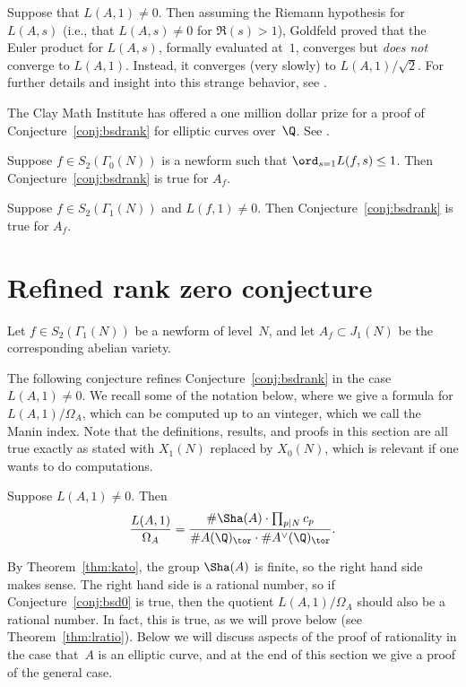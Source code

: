\documentclass{report}
\begin{document}
\begin{remark}
  Suppose that $L(A,1)\neq 0$.  Then assuming the Riemann hypothesis
  for $L(A,s)$ (i.e., that $L(A,s)\neq 0$ for $\Re(s)>1$), Goldfeld
  \cite{goldfeld:L1} proved that the Euler product for $L(A,s)$,
  formally evaluated at~$1$, converges but {\em does not} converge to
  $L(A,1)$.  Instead, it converges (very slowly) to $L(A,1)/\sqrt{2}$.
  For further details and insight into this strange behavior, see
  \cite{conrad:eulerprod}.
\end{remark}


\begin{remark}
  The Clay Math Institute has offered a one million dollar prize for a
  proof of Conjecture~\ref{conj:bsdrank} for elliptic curves
  over~$\Q$.  See \cite{wiles:cmi}.
\end{remark}

\begin{theorem}\label{thm:kolylog}
Suppose $f\in S_2(\Gamma_0(N))$ is a newform such that $\ord_{s=1} L(f,s) \leq 1$. Then
Conjecture~\ref{conj:bsdrank} is true for $A_f$.
\end{theorem}

\begin{theorem}[Kato]\label{thm:kato}
  Suppose $f\in S_2(\Gamma_1(N))$ and $L(f,1)\neq 0$.  Then
  Conjecture~\ref{conj:bsdrank} is true for $A_f$.
\end{theorem}

\section{Refined rank zero conjecture}
Let $f \in S_2(\Gamma_1(N))$ be a newform of level~$N$, and let
$A_f\subset J_1(N)$ be the corresponding abelian variety.

The following conjecture refines Conjecture~\ref{conj:bsdrank} in the
case $L(A,1)\neq 0$.  We recall some of the notation below, where we
give a formula for $L(A,1)/\Omega_A$, which can be computed up to an
vinteger, which we call the Manin index.  Note that the definitions,
results, and proofs in this section are all true exactly as stated
with $X_1(N)$ replaced by $X_0(N)$, which is relevant if one wants
to do computations.

\begin{conjecture}\label{conj:bsd0}
Suppose $L(A,1)\neq 0$.  Then
$$
  \frac{L(A,1)}{\Omega_A}  =
  \frac{\#\Sha(A)\cdot \prod_{p\mid N} c_p}{\#A(\Q)_{\tor}\cdot \#A^{\vee}(\Q)_{\tor}}.
$$
\end{conjecture}
By Theorem~\ref{thm:kato}, the group $\Sha(A)$ is finite, so the right
hand side makes sense.   The right hand side is a rational number, so if
Conjecture~\ref{conj:bsd0} is true, then the quotient $L(A,1)/\Omega_A$
should also be a rational number.  In fact, this is true, as we will prove
below (see Theorem~\ref{thm:lratio}).   Below we will discuss aspects of
the proof of rationality in the case that~$A$ is an elliptic curve, and
at the end of this section we give a proof of the general case.
\end{document}
